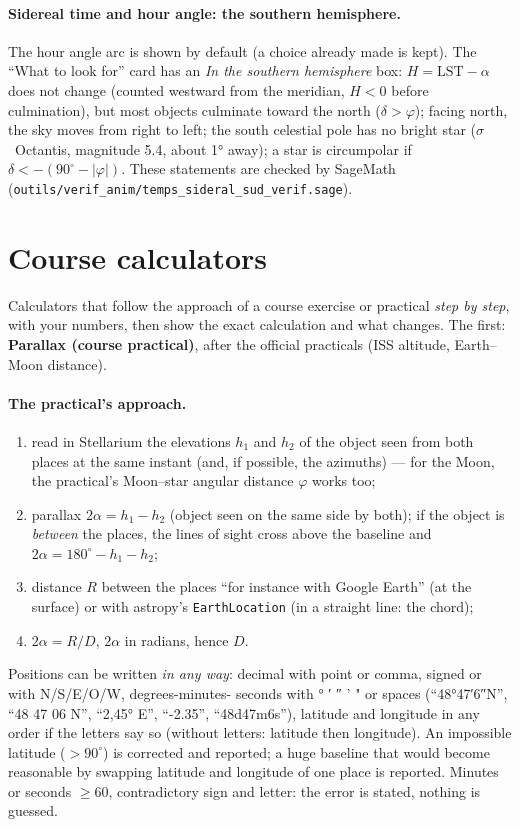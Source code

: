 \paragraph{Sidereal time and hour angle: the southern hemisphere.} The hour angle arc is shown by default (a choice
already made is kept). The “What to look for” card has an \emph{In the southern hemisphere} box:
$H = \mathrm{LST} - \alpha$ does not change (counted westward from the meridian, $H < 0$ before culmination), but most
objects culminate toward the north ($\delta > \varphi$); facing north, the sky moves from right to left; the south
celestial pole has no bright star ($\sigma$~Octantis, magnitude 5.4, about 1° away); a star is circumpolar if
$\delta < -(90^\circ - |\varphi|)$. These statements are checked by SageMath
(\texttt{outils/verif\_anim/temps\_sideral\_sud\_verif.sage}).

\section{Course calculators}\label{sec:td}
Calculators that follow the approach of a course exercise or practical \emph{step by step}, with your numbers, then
show the exact calculation and what changes. The first: \textbf{Parallax (course practical)}, after the official
practicals (ISS altitude, Earth–Moon distance).

\paragraph{The practical's approach.}
\begin{enumerate}
\item read in Stellarium the elevations $h_1$ and $h_2$ of the object seen from both places at the same instant (and,
if possible, the azimuths) — for the Moon, the practical's Moon–star angular distance $\varphi$ works too;
\item parallax $2\alpha = h_1 - h_2$ (object seen on the same side by both); if the object is \emph{between} the places,
the lines of sight cross above the baseline and $2\alpha = 180^\circ - h_1 - h_2$;
\item distance $R$ between the places “for instance with Google Earth” (at the surface) or with astropy's
\texttt{EarthLocation} (in a straight line: the chord);
\item $2\alpha = R/D$, $2\alpha$ in radians, hence $D$.
\end{enumerate}
Positions can be written \emph{in any way}: decimal with point or comma, signed or with N/S/E/O/W, degrees-minutes-%
seconds with ° ′ ″ ' " or spaces (“48°47′6″N”, “48 47 06 N”, “2,45° E”, “-2.35”, “48d47m6s”), latitude and longitude
in any order if the letters say so (without letters: latitude then longitude). An impossible latitude ($> 90^\circ$) is
corrected and reported; a huge baseline that would become reasonable by swapping latitude and longitude of one place is
reported. Minutes or seconds $\ge 60$, contradictory sign and letter: the error is stated, nothing is guessed.

